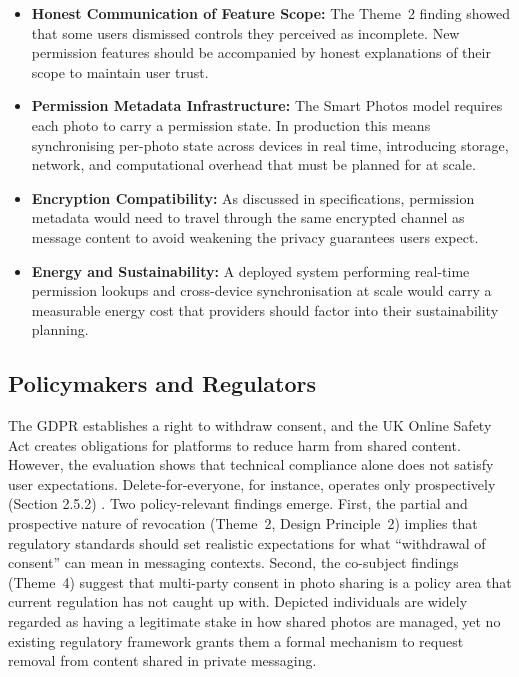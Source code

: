 \begin{itemize}
    \item \textbf{Honest Communication of Feature Scope:} The Theme~2 finding showed that some users dismissed controls they perceived as incomplete. New permission features should be accompanied by honest explanations of their scope to maintain user trust.


    \item \textbf{Permission Metadata Infrastructure:} The Smart Photos model requires each photo to carry a permission state. In production this means synchronising per-photo state across devices in real time, introducing storage, network, and computational overhead that must be planned for at scale.

    \item \textbf{Encryption Compatibility:} As discussed in specifications, permission metadata would need to travel through the 
    same encrypted channel as message content to avoid weakening the 
    privacy guarantees users expect.

    \item \textbf{Energy and Sustainability:} A deployed system 
    performing real-time permission lookups and cross-device 
    synchronisation at scale would carry a measurable energy cost 
    that providers should factor into their sustainability planning.
\end{itemize} 


\subsection*{Policymakers and Regulators}

The GDPR establishes a right to withdraw consent, and the UK Online Safety Act creates obligations for platforms to reduce harm from shared content. However, the evaluation shows that technical compliance alone does not satisfy user expectations. Delete-for-everyone, for instance, operates only prospectively (Section 2.5.2) \cite{politou_2018}. Two policy-relevant findings emerge. First, the partial and prospective nature of revocation (Theme~2, Design Principle~2) implies that regulatory standards should set realistic expectations for what ``withdrawal of consent'' can mean in messaging contexts. Second, the co-subject findings (Theme~4) suggest that multi-party consent in photo sharing is a policy area that current regulation has not caught up with.  Depicted individuals are widely regarded as having a legitimate stake in how shared photos are managed, yet no existing regulatory framework grants them a formal mechanism to request removal from content shared in private messaging.

